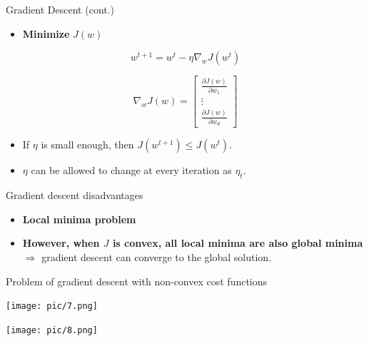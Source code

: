 \documentclass[serif, aspectratio=169]{beamer}
\begin{document}
\begin{frame}{Gradient Descent (cont.)}

    \begin{itemize}
        \item \textbf{Minimize} \( J(w) \)
    \end{itemize}
    
    \[
    w^{t+1} = w^t - \eta \nabla_w J(w^t)
    \]
    
    \[
    \nabla_w J(w) = 
    \begin{bmatrix}
        \frac{\partial J(w)}{\partial w_1} \\
        \vdots \\
        \frac{\partial J(w)}{\partial w_d}
    \end{bmatrix}
    \]
    
    \begin{itemize}
        \item If \( \eta \) is small enough, then \( J(w^{t+1}) \leq J(w^t) \).
        \item \( \eta \) can be allowed to change at every iteration as \( \eta_t \).
    \end{itemize}

\end{frame}

\begin{frame}{Gradient descent disadvantages}

    \begin{itemize}
        \item \textbf{Local minima problem}
        
        \item \textbf{However, when \( J \) is convex, all local minima are also global minima} \(\Rightarrow\) gradient descent can converge to the global solution.
    \end{itemize}

\end{frame}

\begin{frame}{Problem of gradient descent with non-convex cost functions}

    \begin{minipage}{0.48\textwidth}
        \centering
        \texttt{[image: pic/7.png]}
    \end{minipage}%
    \begin{minipage}{0.48\textwidth}
        \centering
        \texttt{[image: pic/8.png]}
    \end{minipage}
    \vfill

\end{frame}
\end{document}
